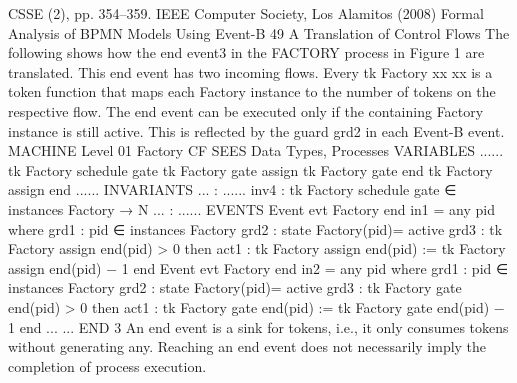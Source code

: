 CSSE (2), pp. 354–359. IEEE Computer Society, Los Alamitos (2008)
Formal Analysis of BPMN Models Using Event-B 49
A Translation of Control Flows
The following shows how the end event3 in the FACTORY process in Figure 1 are
translated. This end event has two incoming flows. Every tk Factory xx xx is a
token function that maps each Factory instance to the number of tokens on the
respective flow. The end event can be executed only if the containing Factory
instance is still active. This is reflected by the guard grd2 in each Event-B event.
MACHINE Level 01 Factory CF
SEES Data Types, Processes VARIABLES
......
tk Factory schedule gate
tk Factory gate assign
tk Factory gate end
tk Factory assign end
...... INVARIANTS
... : ......
inv4 : tk Factory schedule gate ∈ instances Factory → N
... : ...... EVENTS
Event evt Factory end in1 =
any
pid where
grd1 : pid ∈ instances Factory
grd2 : state Factory(pid)= active
grd3 : tk Factory assign end(pid) > 0
then
act1 : tk Factory assign end(pid) := tk Factory assign end(pid) − 1
end
Event evt Factory end in2 =
any
pid where
grd1 : pid ∈ instances Factory
grd2 : state Factory(pid)= active
grd3 : tk Factory gate end(pid) > 0
then
act1 : tk Factory gate end(pid) := tk Factory gate end(pid) − 1
end
... ... END
3 An end event is a sink for tokens, i.e., it only consumes tokens without generating
any. Reaching an end event does not necessarily imply the completion of process
execution.